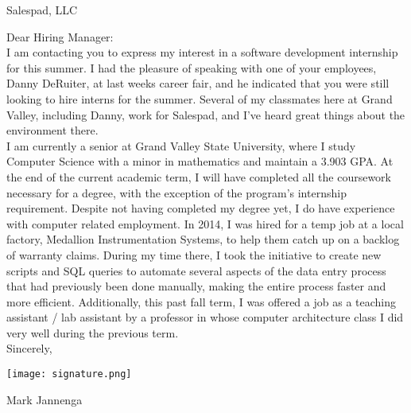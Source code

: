 \documentclass{article}
\begin{document}
	\hfill						%

	\hfill

	Salespad, LLC

	Dear Hiring Manager:\\

	I am contacting you to express my interest in a software development internship for this summer. I had the pleasure of speaking with one of your employees, Danny DeRuiter, at last weeks career fair, and he indicated that you were still looking to hire interns for the summer. Several of my classmates here at Grand Valley, including Danny, work for Salespad, and I've heard great things about the environment there.\\

	I am currently a senior at Grand Valley State University, where I study Computer Science with a minor in mathematics and maintain a 3.903 GPA. At the end of the current academic term, I will have completed all the coursework necessary for a degree, with the exception of the program's internship requirement. Despite not having completed my degree yet, I do have experience with computer related employment. In 2014, I was hired for a temp job at a local factory, Medallion Instrumentation Systems, to help them catch up on a backlog of warranty claims. During my time there, I took the initiative to create new scripts and SQL queries to automate several aspects of the data entry process that had previously been done manually, making the entire process faster and more efficient. Additionally, this past fall term, I was offered a job as a teaching assistant / lab assistant by a professor in whose computer architecture class I did very well during the previous term.\\


	

	Sincerely,

	\texttt{[image: signature.png]}

	Mark Jannenga
\end{document}
